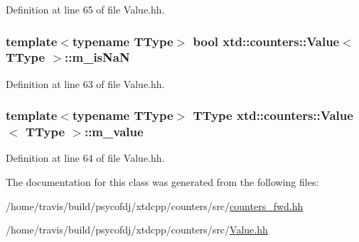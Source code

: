 Definition at line 65 of file Value.\-hh.

\hypertarget{classxtd_1_1counters_1_1Value_a28be66961121bb488351e2c2722fd18a}{
\subsubsection[{m\-\_\-is\-Na\-N}]{\setlength{\rightskip}{0pt plus 5cm}template$<$typename T\-Type$>$ bool {\bf xtd\-::counters\-::\-Value}$<$ T\-Type $>$\-::m\-\_\-is\-Na\-N\hspace{0.3cm}{\ttfamily [protected]}}}\label{classxtd_1_1counters_1_1Value_a28be66961121bb488351e2c2722fd18a}


Definition at line 63 of file Value.\-hh.

\hypertarget{classxtd_1_1counters_1_1Value_abe06c1cebededaf2f216707171f63c3c}{
\subsubsection[{m\-\_\-value}]{\setlength{\rightskip}{0pt plus 5cm}template$<$typename T\-Type$>$ T\-Type {\bf xtd\-::counters\-::\-Value}$<$ T\-Type $>$\-::m\-\_\-value\hspace{0.3cm}{\ttfamily [protected]}}}\label{classxtd_1_1counters_1_1Value_abe06c1cebededaf2f216707171f63c3c}


Definition at line 64 of file Value.\-hh.



The documentation for this class was generated from the following files\-:\begin{DoxyCompactItemize}
\item 
/home/travis/build/psycofdj/xtdcpp/counters/src/\hyperlink{counters__fwd_8hh}{counters\-\_\-fwd.\-hh}\item 
/home/travis/build/psycofdj/xtdcpp/counters/src/\hyperlink{Value_8hh}{Value.\-hh}\end{DoxyCompactItemize}
